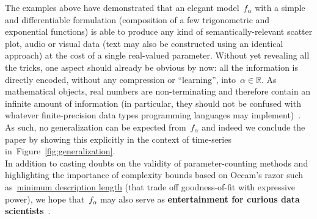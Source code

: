 \documentclass{article}
\begin{document}
\noindent The examples above have demonstrated that an elegant model~$f_\alpha$ with a simple and differentiable formulation (composition of a few trigonometric and exponential functions) is able to produce any kind of semantically-relevant scatter plot, audio or visual data (text may also be constructed using an identical approach) at the cost of a single real-valued parameter.  Without yet revealing all the tricks, one aspect should already be obvious by now: all the information is directly encoded, without any compression or ``learning'', into~$\alpha \in \mathbb{R}$.  As mathematical objects, real numbers are non-terminating and therefore contain an infinite amount of information (in particular, they should not be confused with whatever finite-precision data types programming languages may implement)~\cite{chaitin}.  As such, no generalization can be expected from~$f_\alpha$ and indeed we conclude the paper by showing this explicitly in the context of time-series in~Figure~\ref{fig:generalization}. \\

\noindent In addition to casting doubts on the validity of parameter-counting methods and highlighting the importance of complexity bounds based on Occam's razor such as~\href{https://en.wikipedia.org/wiki/Minimum\_description\_length}{minimum description length} (that trade off goodness-of-fit with expressive power), we hope that~$f_\alpha$ may also serve as {\bf entertainment for curious data scientists}~\cite{laurent}. 
\end{document}
